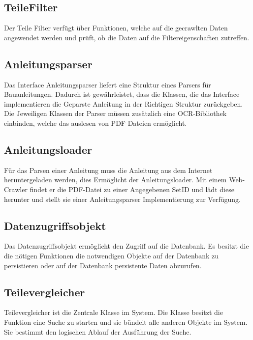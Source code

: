 \subsection{TeileFilter}
Der Teile Filter verfügt über Funktionen, welche auf die gecrawlten Daten angewendet werden und prüft, ob die Daten auf die Filtereigenschaften zutreffen.

\subsection{Anleitungsparser}
Das Interface Anleitungsparser liefert eine Struktur eines Parsers für Bauanleitungen. Dadurch ist gewährleistet, dass die Klassen, die das Interface implementieren die Geparste Anleitung in der Richtigen Struktur zurückgeben. Die Jeweiligen Klassen der Parser müssen zusätzlich eine OCR-Bibliothek einbinden, welche das auslesen von PDF Dateien ermöglicht. \newline 
\newline 
\subsection{Anleitungsloader}
Für das Parsen einer Anleitung muss die Anleitung aus dem Internet heruntergeladen werden, dies Ermöglicht der Anleitungsloader. Mit einem Web-Crawler findet er die PDF-Datei zu einer Angegebenen SetID und lädt diese herunter und stellt sie einer Anleitungsparser Implementierung zur Verfügung. \newline 
\newline 
\subsection{Datenzugriffsobjekt}
Das Datenzugriffsobjekt ermöglicht den Zugriff auf die Datenbank. Es besitzt die die nötigen Funktionen die notwendigen Objekte auf der Datenbank zu persistieren oder auf der Datenbank persistente Daten abzurufen. \newline 
\newline 
\subsection{Teilevergleicher}
Teilevergleicher ist die Zentrale Klasse im System.  Die Klasse besitzt die Funktion eine Suche zu starten und sie bündelt alle anderen Objekte im System. Sie bestimmt den logischen Ablauf der Ausführung der Suche.\newline 

